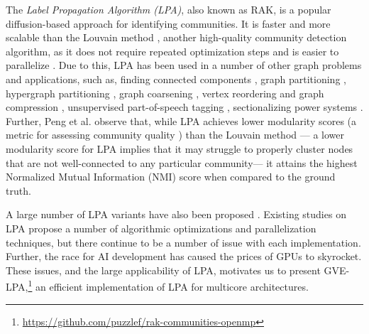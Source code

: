 The \textit{Label Propagation Algorithm (LPA)}, also known as RAK, \cite{com-raghavan07} is a popular diffusion-based approach for identifying communities. It is faster and more scalable than the Louvain method \cite{com-blondel08}, another high-quality community detection algorithm, as it does not require repeated optimization steps and is easier to parallelize \cite{com-newman04, com-raghavan07}. Due to this, LPA has been used in a number of other graph problems and applications, such as, finding connected components \cite{stergiou2018shortcutting}, graph partitioning \cite{slota2014pulp, wang2014partition, meyerhenke2014partitioning, meyerhenke2016partitioning, meyerhenke2017parallel, bae2020label, akhremtsev2020high, slota2020scalable, zhang2020multilevel}, hypergraph partitioning \cite{henne2015label, gottesburen2021scalable}, graph coarsening \cite{valejo2020coarsening}, vertex reordering and graph compression \cite{boldi2011layered}, unsupervised part-of-speech tagging \cite{das2011unsupervised}, sectionalizing power systems \cite{aziz2023novel}. Further, Peng et al. \cite{peng2014accelerating} observe that, while LPA achieves lower modularity scores (a metric for assessing community quality \cite{com-newman04}) than the Louvain method --- a lower modularity score for LPA implies that it may struggle to properly cluster nodes that are not well-connected to any particular community--- it attains the highest Normalized Mutual Information (NMI) score when compared to the ground truth.

A large number of LPA variants have also been proposed \cite{li2015parallel, farnadi2015scalable, li2015detecting, shen2016topic, mohan2017scalable, zhang2017label, berahmand2018lp, ma2018psplpa, sattari2018spreading, zheng2018improved, xu2019distributed, zarei2020detecting, maleki2020dhlp, zhang2020lilpa, el2021wlni, roghani2021pldls, zhang2023large}. Existing studies on LPA propose a number of algorithmic optimizations and parallelization techniques, but there continue to be a number of issue with each implementation. Further, the race for AI development has caused the prices of GPUs to skyrocket. These issues, and the large applicability of LPA, motivates us to present GVE-LPA,\footnote{\url{https://github.com/puzzlef/rak-communities-openmp}} an efficient implementation of LPA for multicore architectures.

